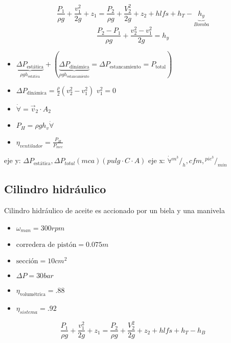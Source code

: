 \[
    \frac{ P_{1} }{ \rho g } + \frac{ v_{1}^{2} }{ 2g } + z_{1} = \frac{ P_{2} }{ \rho g } + \frac{ V_{2}^{2} }{ 2g } + z_{2} + hlfs + h_{T} - \underbrace{ h_{y} }_{Bomba}
\]
\[
    \frac{ P_{2} - P_{1} }{ \rho g } + \frac{ v_{2}^{2} - v_{1}^{2} }{ 2g } = h_{y}
\]

\begin{itemize}
    \item \( \underbrace{ \Delta P_{\text{estática}} }_{\rho g h_{\text{estática}}} + ( \underbrace{ \Delta P_{\text{dinámica}} }_{\rho g h_{\text{estancamiento}}} = \Delta P_{\text{estancamiento}} = P_{\text{total}} ) \) 
    \item \( \Delta P_{\text{dinámica}} = \frac{ \rho }{ 2 } (v_{2}^{2} - v_{1}^{2} ) \) \;\; \( v_{1}^{2} = 0 \)
    \item \( \dot{\forall} = \vec{v}_{2} \cdot A_{2} \) 
    \item \( P_{H} = \rho g h_{v} \dot{\forall} \)
    \item \( \eta_{ventilador} = \frac{ P_{H} }{ P_{mec} } \)
\end{itemize}

eje y: \( \Delta P_{\text{estática}}, \Delta P_{total} (mca) (pulg \cdot C \cdot A)\)
eje x: \( \dot{\forall} {}^{m^{3}}/_{h}, cfm, {}^{pie^{3}}/_{min} \)

\subsection{Cilindro hidráulico}
Cilindro hidráulico de aceite es accionado por un biela y una manivela

\begin{itemize}
    \item \( \omega_{man} = 300 rpm \)
    \item \( \text{corredera de pistón} = 0.075m \)
    \item \( \text{sección} = 10 cm^{2} \)
    \item \( \Delta P = 30 bar \)
    \item \( \eta_{\text{volumétrica}} = .88 \)
    \item \( \eta_{sistema} = .92 \)
\end{itemize}


\[
    \frac{ P_{1} }{ \rho g } + \frac{ v_{1}^{2} }{ 2g } + z_{1} = \frac{ P_{2} }{ \rho g } + \frac{ V_{2}^{2} }{ 2g } + z_{2} + hlfs + h_{T} - h_{B}
\]

